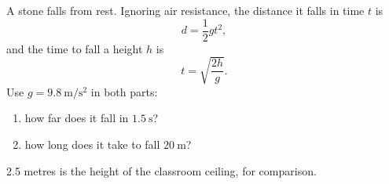 \documentclass[11pt]{article}
\begin{document}
A stone falls from rest. Ignoring air resistance, the distance it falls in time $t$ is
\begin{equation}
  d = \frac{1}{2} g t^2 ,
  \label{eq:fall}
\end{equation}
and the time to fall a height $h$ is
\begin{equation}
  t = \sqrt{\frac{2 h}{g}} .
  \label{eq:time}
\end{equation}
Use $g = 9.8\ \mathrm{m/s^2}$ in both parts:
\begin{enumerate}
  \renewcommand{\labelenumi}{(\roman{enumi})}
  \item how far does it fall in $1.5\ \mathrm{s}$?
  \item how long does it take to fall $20\ \mathrm{m}$?
\end{enumerate}
2.5 metres is the height of the classroom ceiling, for comparison.
\end{document}
